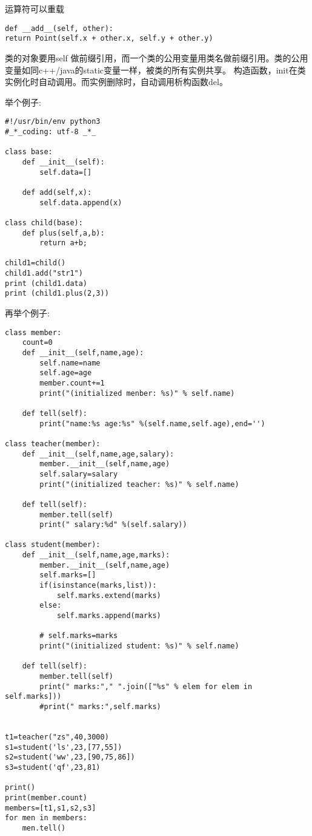 \documentclass[twoside,11pt]{book}
\begin{document}
运算符可以重载
\begin{lstlisting}
def __add__(self, other):
return Point(self.x + other.x, self.y + other.y)
\end{lstlisting}


类的对象要用self 做前缀引用，而一个类的公用变量用类名做前缀引用。类的公用变量如同c++/java的static变量一样，被类的所有实例共享。
构造函数，init在类实例化时自动调用。而实例删除时，自动调用析构函数del。

举个例子:
\begin{lstlisting}
#!/usr/bin/env python3
#_*_coding: utf-8 _*_

class base:
    def __init__(self):
        self.data=[]

    def add(self,x):
        self.data.append(x)

class child(base):
    def plus(self,a,b):
        return a+b;

child1=child()
child1.add("str1")
print (child1.data)
print (child1.plus(2,3))
\end{lstlisting}

再举个例子:
\begin{lstlisting}
class member:
    count=0
    def __init__(self,name,age):
        self.name=name
        self.age=age
        member.count+=1
        print("(initialized menber: %s)" % self.name)

    def tell(self):
        print("name:%s age:%s" %(self.name,self.age),end='')

class teacher(member):
    def __init__(self,name,age,salary):
        member.__init__(self,name,age)
        self.salary=salary
        print("(initialized teacher: %s)" % self.name)

    def tell(self):
        member.tell(self)
        print(" salary:%d" %(self.salary))

class student(member):
    def __init__(self,name,age,marks):
        member.__init__(self,name,age)
        self.marks=[]
        if(isinstance(marks,list)):
            self.marks.extend(marks)
        else:
            self.marks.append(marks)

        # self.marks=marks
        print("(initialized student: %s)" % self.name)

    def tell(self):
        member.tell(self)
        print(" marks:"," ".join(["%s" % elem for elem in self.marks]))
        #print(" marks:",self.marks)


t1=teacher("zs",40,3000)
s1=student('ls',23,[77,55])
s2=student('ww',23,[90,75,86])
s3=student('qf',23,81)

print()
print(member.count)
members=[t1,s1,s2,s3]
for men in members:
    men.tell()
\end{lstlisting}
\end{document}
